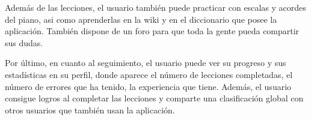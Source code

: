 Además de las lecciones, el usuario también puede practicar con escalas y acordes del piano, asi como aprenderlas en la wiki y en el diccionario que 
posee la aplicación. También dispone de un foro para que toda la gente pueda compartir sus dudas.

Por último, en cuanto al seguimiento, el usuario puede ver su progreso y sus estadísticas en su perfil, donde aparece el número de lecciones
completadas, el número de errores que ha tenido, la experiencia que tiene. Además, el usuario consigue logros al completar las lecciones y 
comparte una clasificación global con otros usuarios que también usan la aplicación.


\begin{figure}[H]
    \centering
    \hspace{3em}
\end{figure}

